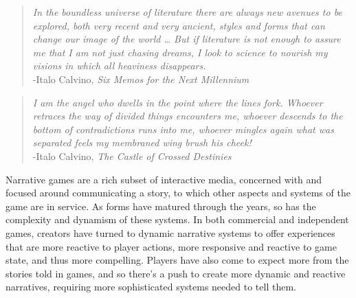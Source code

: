 

\begin{quote}
    \textit{In the boundless universe of literature there are always new avenues to be explored, both very recent and very ancient, styles and forms that can change our image of the world … But if literature is not enough to assure me that I am not just chasing dreams, I look to science to nourish my visions in which all heaviness disappears.}\\
    -Italo Calvino, \textit{Six Memos for the Next Millennium}
\end{quote}

\begin{quote}
    \textit{I am the angel who dwells in the point where the lines fork. Whoever retraces the way of divided things encounters me, whoever descends to the bottom of contradictions runs into me, whoever mingles again what was separated feels my membraned wing brush his cheek!}\\
    -Italo Calvino, \textit{The Castle of Crossed Destinies}
\end{quote}

Narrative games are a rich subset of interactive media, concerned with and focused around communicating a story, to which other aspects and systems of the game are in service. As forms have matured through the years, so has the complexity and dynamism of these systems. In both commercial and independent games, creators have turned to dynamic narrative systems to offer experiences that are more reactive to player actions, more responsive and reactive to game state, and thus more compelling. Players have also come to expect more from the stories told in games, and so there's a push to create more dynamic and reactive narratives, requiring more sophisticated systems needed to tell them.

